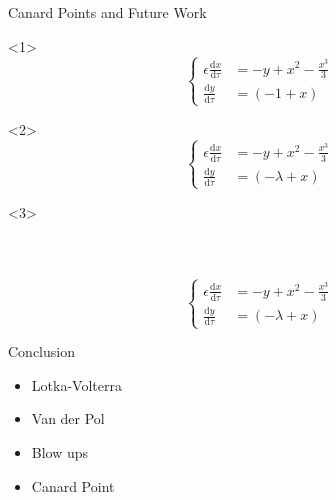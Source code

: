 \documentclass[11pt]{beamer}
\newcommand{\dif}{\mathrm{d}}
\begin{document}
\begin{frame}{Canard Points and Future Work}
\begin{onlyenv}<1>
\begin{equation*} 
        \begin{cases}
        \epsilon\frac{\dif x}{\dif \tau} &= -y + x^2 - \frac{x^3}{3}\\ 
        \frac{\dif y}{\dif \tau}&= (-1+x)
        \end{cases}
        \end{equation*}
\end{onlyenv}

\begin{onlyenv}<2>
    \begin{equation*}
         \begin{cases}
        \epsilon\frac{\dif x}{\dif \tau} &= -y + x^2 - \frac{x^3}{3}\\ 
        \frac{\dif y}{\dif \tau}&= (-\lambda+x)
        \end{cases}
        \end{equation*}
\end{onlyenv}

\begin{onlyenv}<3>
\begin{columns}
\begin{figure}
    \centering
{}

\end{figure}
\begin{figure}
    \centering
{}
\end{figure}
 

\end{columns}
\begin{equation*} 
        \begin{cases}
        \epsilon\frac{\dif x}{\dif \tau} &= -y + x^2 - \frac{x^3}{3}\\ 
        \frac{\dif y}{\dif \tau}&= (-\lambda+x)
        \end{cases}
        \end{equation*}
\end{onlyenv}
\end{frame}

\begin{frame}{Conclusion}
\begin{itemize}
    \item Lotka-Volterra 
    \item Van der Pol 
    \item Blow ups 
    \item Canard Point
\end{itemize}
\end{frame}


\end{document}
